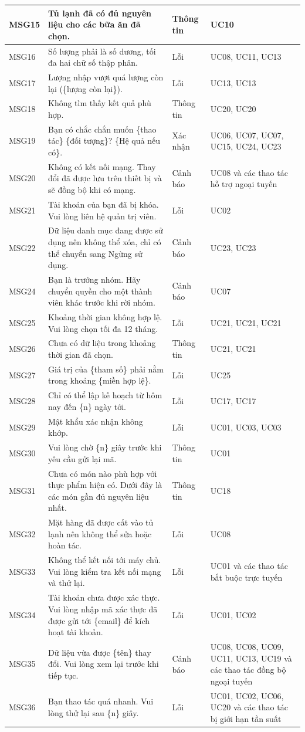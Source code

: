 {\begin{longtable}{|C{1.4cm}|L{\dimexpr{}\arrayrulewidth-1.4cm-1.9cm-3.6cm\relax}|C{1.9cm}|L{3.6cm}|}
MSG15 & Tủ lạnh đã có đủ nguyên liệu cho các bữa ăn đã chọn. & Thông tin & UC10\\ \hline
MSG16 & Số lượng phải là số dương, tối đa hai chữ số thập phân. & Lỗi & UC08, UC11, UC13\\ \hline
MSG17 & Lượng nhập vượt quá lượng còn lại (\{lượng còn lại\}). & Lỗi & UC13, UC13\\ \hline
MSG18 & Không tìm thấy kết quả phù hợp. & Thông tin & UC20, UC20\\ \hline
MSG19 & Bạn có chắc chắn muốn \{thao tác\} \{đối tượng\}? \{Hệ quả nếu có\}. & Xác nhận & UC06, UC07, UC07, UC15, UC24, UC23\\ \hline
MSG20 & Không có kết nối mạng. Thay đổi đã được lưu trên thiết bị và sẽ đồng bộ khi có mạng. & Cảnh báo & UC08 và các thao tác hỗ trợ ngoại tuyến\\ \hline
MSG21 & Tài khoản của bạn đã bị khóa. Vui lòng liên hệ quản trị viên. & Lỗi & UC02\\ \hline
MSG22 & Dữ liệu danh mục đang được sử dụng nên không thể xóa, chỉ có thể chuyển sang Ngừng sử dụng. & Cảnh báo & UC23, UC23\\ \hline
MSG24 & Bạn là trưởng nhóm. Hãy chuyển quyền cho một thành viên khác trước khi rời nhóm. & Cảnh báo & UC07\\ \hline
MSG25 & Khoảng thời gian không hợp lệ. Vui lòng chọn tối đa 12 tháng. & Lỗi & UC21, UC21, UC21\\ \hline
MSG26 & Chưa có dữ liệu trong khoảng thời gian đã chọn. & Thông tin & UC21, UC21\\ \hline
MSG27 & Giá trị của \{tham số\} phải nằm trong khoảng \{miền hợp lệ\}. & Lỗi & UC25\\ \hline
MSG28 & Chỉ có thể lập kế hoạch từ hôm nay đến \{n\} ngày tới. & Lỗi & UC17, UC17\\ \hline
MSG29 & Mật khẩu xác nhận không khớp. & Lỗi & UC01, UC03, UC03\\ \hline
MSG30 & Vui lòng chờ \{n\} giây trước khi yêu cầu gửi lại mã. & Thông tin & UC01\\ \hline
MSG31 & Chưa có món nào phù hợp với thực phẩm hiện có. Dưới đây là các món gần đủ nguyên liệu nhất. & Thông tin & UC18\\ \hline
MSG32 & Mặt hàng đã được cất vào tủ lạnh nên không thể sửa hoặc hoàn tác. & Lỗi & UC08\\ \hline
MSG33 & Không thể kết nối tới máy chủ. Vui lòng kiểm tra kết nối mạng và thử lại. & Lỗi & UC01 và các thao tác bắt buộc trực tuyến\\ \hline
MSG34 & Tài khoản chưa được xác thực. Vui lòng nhập mã xác thực đã được gửi tới \{email\} để kích hoạt tài khoản. & Lỗi & UC01, UC02\\ \hline
MSG35 & Dữ liệu vừa được \{tên\} thay đổi. Vui lòng xem lại trước khi tiếp tục. & Cảnh báo & UC08, UC08, UC09, UC11, UC13, UC19 và các thao tác đồng bộ ngoại tuyến\\ \hline
MSG36 & Bạn thao tác quá nhanh. Vui lòng thử lại sau \{n\} giây. & Lỗi & UC01, UC02, UC06, UC20 và các thao tác bị giới hạn tần suất\\ \hline
\end{longtable}
}
